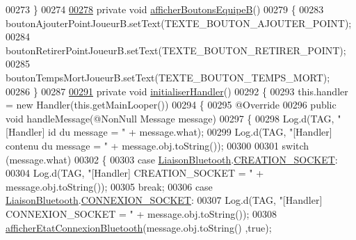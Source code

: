 \begin{DoxyCode}
00273     \}
00274 
\hyperlink{classcom_1_1example_1_1area_1_1_i_h_m_gestion_partie_a00c0111f1b2d4d1161515e2c04ca645c}{00278}     \textcolor{keyword}{private} \textcolor{keywordtype}{void} \hyperlink{classcom_1_1example_1_1area_1_1_i_h_m_gestion_partie_a00c0111f1b2d4d1161515e2c04ca645c}{afficherBoutonsEquipeB}()
00279     \{
00283         boutonAjouterPointJoueurB.setText(TEXTE\_BOUTON\_AJOUTER\_POINT);
00284         boutonRetirerPointJoueurB.setText(TEXTE\_BOUTON\_RETIRER\_POINT);
00285         boutonTempsMortJoueurB.setText(TEXTE\_BOUTON\_TEMPS\_MORT);
00286     \}
00287 
\hyperlink{classcom_1_1example_1_1area_1_1_i_h_m_gestion_partie_a26db1ff779d6ce415ab481dd79295115}{00291}     \textcolor{keyword}{private} \textcolor{keywordtype}{void} \hyperlink{classcom_1_1example_1_1area_1_1_i_h_m_gestion_partie_a26db1ff779d6ce415ab481dd79295115}{initialiserHandler}()
00292     \{
00293         this.handler = \textcolor{keyword}{new} Handler(this.getMainLooper())
00294         \{
00295             @Override
00296             \textcolor{keyword}{public} \textcolor{keywordtype}{void} handleMessage(@NonNull Message message)
00297             \{
00298                 Log.d(TAG, \textcolor{stringliteral}{"[Handler] id du message = "} + message.what);
00299                 Log.d(TAG, \textcolor{stringliteral}{"[Handler] contenu du message = "} + message.obj.toString());
00300 
00301                 \textcolor{keywordflow}{switch} (message.what)
00302                 \{
00303                     \textcolor{keywordflow}{case} \hyperlink{classcom_1_1example_1_1area_1_1_liaison_bluetooth}{LiaisonBluetooth}.\hyperlink{classcom_1_1example_1_1area_1_1_liaison_bluetooth_ac961c73879bd0de9933b2fc310cc5e7e}{CREATION\_SOCKET}:
00304                         Log.d(TAG, \textcolor{stringliteral}{"[Handler] CREATION\_SOCKET = "} + message.obj.toString());
00305                         \textcolor{keywordflow}{break};
00306                     \textcolor{keywordflow}{case} \hyperlink{classcom_1_1example_1_1area_1_1_liaison_bluetooth}{LiaisonBluetooth}.\hyperlink{classcom_1_1example_1_1area_1_1_liaison_bluetooth_a4870b4fac5c0f1aedac1bb40346d43da}{CONNEXION\_SOCKET}:
00307                         Log.d(TAG, \textcolor{stringliteral}{"[Handler] CONNEXION\_SOCKET = "} + message.obj.toString());
00308                         \hyperlink{classcom_1_1example_1_1area_1_1_i_h_m_gestion_partie_a73fa6d212cf9c5e4dc8fadc96d8d35e9}{afficherEtatConnexionBluetooth}(message.obj.toString()
      ,\textcolor{keyword}{true});

\end{DoxyCode}
